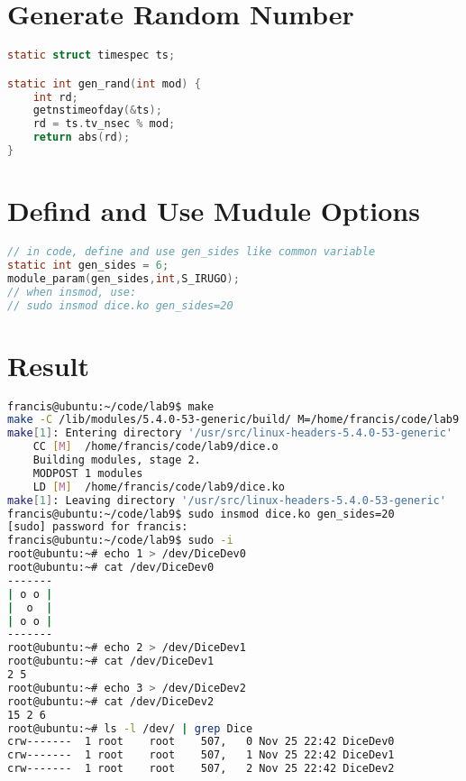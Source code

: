 \documentclass[a4paper]{article}
\begin{document}
\section{Generate Random Number}
\begin{lstlisting}[language=c]
static struct timespec ts;

static int gen_rand(int mod) {
    int rd;
    getnstimeofday(&ts);
    rd = ts.tv_nsec % mod;
    return abs(rd);
}
\end{lstlisting}


\section{Defind and Use Mudule Options}
\begin{lstlisting}[language=c]
// in code, define and use gen_sides like common variable
static int gen_sides = 6;
module_param(gen_sides,int,S_IRUGO);
// when insmod, use:
// sudo insmod dice.ko gen_sides=20
\end{lstlisting}

\section{Result}

\begin{lstlisting}[language=sh]
francis@ubuntu:~/code/lab9$ make
make -C /lib/modules/5.4.0-53-generic/build/ M=/home/francis/code/lab9 modules CFLAGS='-std=c11'
make[1]: Entering directory '/usr/src/linux-headers-5.4.0-53-generic'
    CC [M]  /home/francis/code/lab9/dice.o
    Building modules, stage 2.
    MODPOST 1 modules
    LD [M]  /home/francis/code/lab9/dice.ko
make[1]: Leaving directory '/usr/src/linux-headers-5.4.0-53-generic'
francis@ubuntu:~/code/lab9$ sudo insmod dice.ko gen_sides=20
[sudo] password for francis:
francis@ubuntu:~/code/lab9$ sudo -i
root@ubuntu:~# echo 1 > /dev/DiceDev0
root@ubuntu:~# cat /dev/DiceDev0
-------
| o o |
|  o  |
| o o |
-------
root@ubuntu:~# echo 2 > /dev/DiceDev1
root@ubuntu:~# cat /dev/DiceDev1
2 5
root@ubuntu:~# echo 3 > /dev/DiceDev2
root@ubuntu:~# cat /dev/DiceDev2
15 2 6
root@ubuntu:~# ls -l /dev/ | grep Dice
crw-------  1 root    root    507,   0 Nov 25 22:42 DiceDev0
crw-------  1 root    root    507,   1 Nov 25 22:42 DiceDev1
crw-------  1 root    root    507,   2 Nov 25 22:42 DiceDev2
\end{lstlisting}

% 
\end{document}
